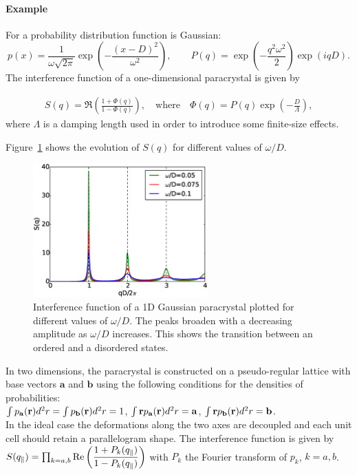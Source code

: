 \paragraph{Example} For a probability distribution function is Gaussian:
\begin{equation*}
p(x)=\frac{1}{\omega \sqrt{2\pi}} \exp\left(-\dfrac{(x-D)^2}{\omega^2}\right),\qquad P(q)=\exp\left(-\frac{q^2 \omega^2}{2}\right)\exp(iqD).
\end{equation*}
 The interference function of a one-dimensional paracrystal is given by

\begin{align*}
S(q) =\Re \left(\frac{1+\Phi(q) }{1 - \Phi(q)} \right), \quad \mathrm{where}\quad \Phi(q) = P(q)\exp\left(-\frac{D}{\Lambda}\right),
\end{align*}
where $\Lambda$ is a damping length used in order to introduce some finite-size effects.

Figure~\ref{fig:1dparas_q} shows the evolution of $S(q)$ for different values of $\omega /D$. 

\begin{figure}[tb]
\begin{center}
\includegraphics[width=0.6\textwidth]{fig/funcplot/S_q_1Dparacrystal.eps}
\end{center}
\caption{Interference function of a 1D Gaussian paracrystal plotted for different values of $\omega /D$. The peaks broaden with a decreasing amplitude as $\omega/D$ increases. This shows the transition between an ordered and a disordered states. }
\label{fig:1dparas_q}
\end{figure}

In two dimensions, the paracrystal is constructed on a pseudo-regular lattice with base vectors $\mathbf{a}$ and $\mathbf{b}$ using the following conditions for the densities of probabilities:\\ $\int p_{\mathbf{a}}(\mathbf{r})d^2r=\int p_{\mathbf{b}}(\mathbf{r})d^2r=1$, $\int \mathbf{r} p_{\mathbf{a}}(\mathbf{r})d^2r=\mathbf{a}$, $\int \mathbf{r} p_{\mathbf{b}}(\mathbf{r})d^2r=\mathbf{b}$.\\
In the ideal case the deformations along the two axes are decoupled and each unit cell should retain a parallelogram shape. The interference function is given by\\ $S(q_{\parallel})=\prod_{k=a,b}\operatorname{Re}\left(\dfrac{1+P_k(q_{\parallel})}{1-P_k(q_{\parallel})} \right)$ with $P_k$ the Fourier transform of $p_k$, $k=a, b$.

